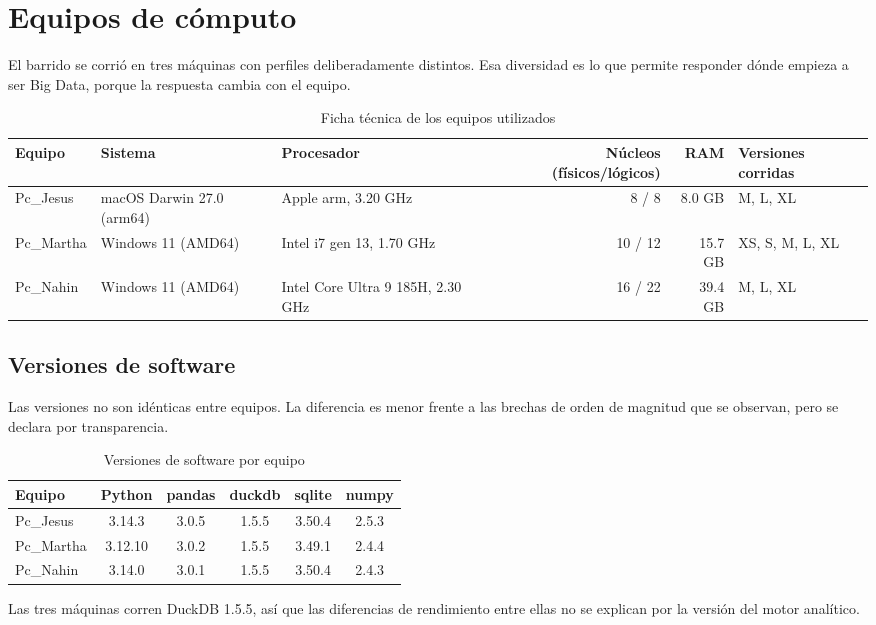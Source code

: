 \section{Equipos de cómputo}

El barrido se corrió en tres máquinas con perfiles deliberadamente distintos. Esa diversidad es lo que permite responder dónde empieza a ser Big Data, porque la respuesta cambia con el equipo.

\begin{table}[htbp]
\centering
\small
\caption{Ficha técnica de los equipos utilizados}
\label{tab:equipos}
\begin{tabularx}{\textwidth}{lXXrrX}
\toprule
Equipo & Sistema & Procesador & Núcleos (físicos/lógicos) & RAM & Versiones corridas \\
\midrule
Pc\_Jesus  & macOS Darwin 27.0 (arm64) & Apple arm, 3.20 GHz & 8 / 8 & 8.0 GB & M, L, XL \\
Pc\_Martha & Windows 11 (AMD64) & Intel i7 gen 13, 1.70 GHz & 10 / 12 & 15.7 GB & XS, S, M, L, XL \\
Pc\_Nahin  & Windows 11 (AMD64) & Intel Core Ultra 9 185H, 2.30 GHz & 16 / 22 & 39.4 GB & M, L, XL \\
\bottomrule
\end{tabularx}
\end{table}

\subsection{Versiones de software}

Las versiones no son idénticas entre equipos. La diferencia es menor frente a las brechas de orden de magnitud que se observan, pero se declara por transparencia.

\begin{table}[htbp]
\centering
\caption{Versiones de software por equipo}
\label{tab:software}
\begin{tabular}{lccccc}
\toprule
Equipo & Python & pandas & duckdb & sqlite & numpy \\
\midrule
Pc\_Jesus  & 3.14.3  & 3.0.5 & 1.5.5 & 3.50.4 & 2.5.3 \\
Pc\_Martha & 3.12.10 & 3.0.2 & 1.5.5 & 3.49.1 & 2.4.4 \\
Pc\_Nahin  & 3.14.0  & 3.0.1 & 1.5.5 & 3.50.4 & 2.4.3 \\
\bottomrule
\end{tabular}
\end{table}

Las tres máquinas corren DuckDB 1.5.5, así que las diferencias de rendimiento entre ellas no se explican por la versión del motor analítico.
